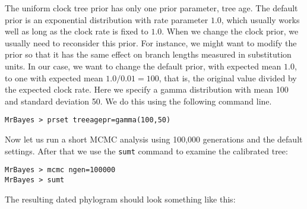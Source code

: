 \documentclass[12pt]{book}
\begin{document}
The uniform clock tree prior has only one prior parameter, tree age. The default prior is an
exponential distribution with rate parameter $1.0$, which usually works well as long as the clock
rate is fixed to $1.0$. When we change the clock prior, we usually need to reconsider this prior.
For instance, we might want to modify the prior so that it has the same effect on branch lengths
measured in substitution units. In our case, we want to change the default prior, with expected
mean $1.0$, to one with expected mean $1.0 / 0.01 = 100$, that is, the original value divided by
the expected clock rate.
Here we specify a gamma distribution with mean 100 and standard deviation 50.
We do this using the following command line.

\begin{Verbatim}
MrBayes > prset treeagepr=gamma(100,50)
\end{Verbatim}

Now let us run a short MCMC analysis using 100,000 generations and the default settings. After that
we use the \texttt{sumt} command to examine the calibrated tree:

\begin{Verbatim}
MrBayes > mcmc ngen=100000
MrBayes > sumt
\end{Verbatim}

The resulting dated phylogram should look something like this:
\end{document}
